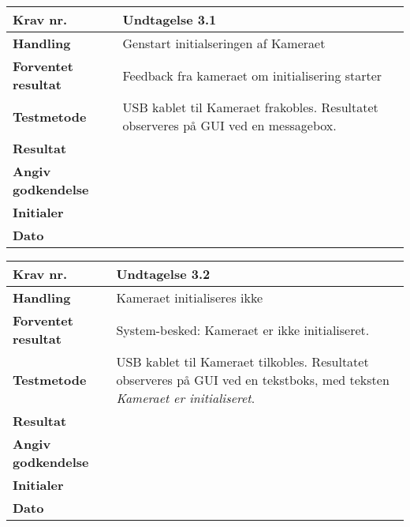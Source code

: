 	\begin{center}
		\begin{longtable}{ | m{4cm}| m{8.5cm}|} 
			\hline
			\textbf{Krav nr.} & Undtagelse 3.1   \\ 
			\hline
			\textbf{Handling} & Genstart initialseringen af Kameraet  \\
			\hline
			\textbf{Forventet resultat} & Feedback fra kameraet om initialisering starter \\
			\hline
			\textbf{Testmetode}  & USB kablet til Kameraet frakobles. Resultatet observeres på GUI ved en messagebox.   \\
			\hline
			\textbf{Resultat}  &    \\
			\hline
			\textbf{Angiv godkendelse} &     \\
			\hline
			\textbf{Initialer} &     \\
			\hline
			\textbf{Dato} &    \\
			\hline
		\end{longtable}
	\end{center}
	
	\begin{center}
		\begin{longtable}{ | m{4cm}| m{8.5cm}|} 
			\hline
			\textbf{Krav nr.} & Undtagelse 3.2   \\ 
			\hline
			\textbf{Handling} & Kameraet initialiseres ikke  \\
			\hline
			\textbf{Forventet resultat} & System-besked: Kameraet er ikke initialiseret. \\
			\hline
			\textbf{Testmetode}  & USB kablet til Kameraet tilkobles. Resultatet observeres på GUI ved en tekstboks, med teksten \textit{Kameraet er initialiseret}.   \\
			\hline
			\textbf{Resultat}  &    \\
			\hline
			\textbf{Angiv godkendelse} &     \\
			\hline
			\textbf{Initialer} &     \\
			\hline
			\textbf{Dato} &    \\
			\hline
		\end{longtable}
	\end{center}